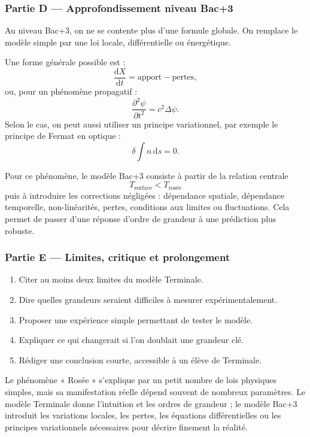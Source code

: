 \documentclass[11pt,a4paper]{article}
\begin{document}
\subsubsection*{Partie D — Approfondissement niveau Bac+3}

\begin{approfondissementbox}
Au niveau Bac+3, on ne se contente plus d'une formule globale. On remplace le modèle simple par une loi locale, différentielle ou énergétique.

Une forme générale possible est :
\[
\frac{\mathrm d X}{\mathrm dt}=\text{apport}-\text{pertes},
\]
ou, pour un phénomène propagatif :
\[
\frac{\partial^2 \psi}{\partial t^2}=c^2\Delta\psi.
\]
Selon le cas, on peut aussi utiliser un principe variationnel, par exemple le principe de Fermat en optique :
\[
\delta \int n\,\mathrm ds=0.
\]

Pour ce phénomène, le modèle Bac+3 consiste à partir de la relation centrale
\[
T_{\mathrm{surface}}<T_{\mathrm{rosée}}
\]
puis à introduire les corrections négligées : dépendance spatiale, dépendance temporelle, non-linéarités, pertes, conditions aux limites ou fluctuations. Cela permet de passer d'une réponse d'ordre de grandeur à une prédiction plus robuste.
\end{approfondissementbox}

\subsubsection*{Partie E — Limites, critique et prolongement}

\begin{enumerate}
  \item Citer au moins deux limites du modèle Terminale.
  \item Dire quelles grandeurs seraient difficiles à mesurer expérimentalement.
  \item Proposer une expérience simple permettant de tester le modèle.
  \item Expliquer ce qui changerait si l'on doublait une grandeur clé.
  \item Rédiger une conclusion courte, accessible à un élève de Terminale.
\end{enumerate}

\begin{corrigebox}
Le phénomène « Rosée » s'explique par un petit nombre de lois physiques simples, mais sa manifestation réelle dépend souvent de nombreux paramètres. Le modèle Terminale donne l'intuition et les ordres de grandeur ; le modèle Bac+3 introduit les variations locales, les pertes, les équations différentielles ou les principes variationnels nécessaires pour décrire finement la réalité.
\end{corrigebox}
\end{document}
